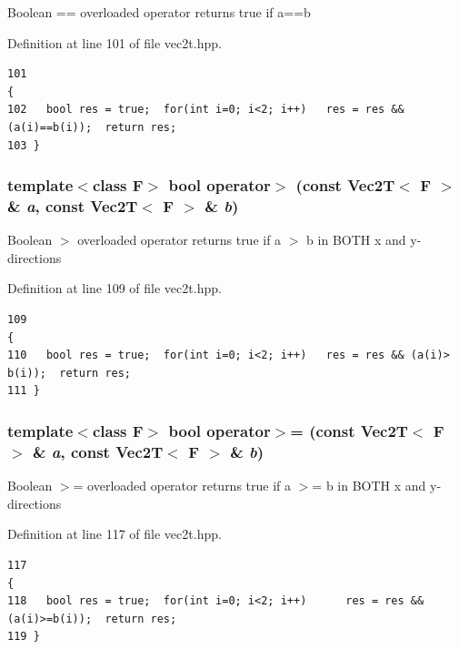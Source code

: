 Boolean == overloaded operator returns true if a==b 

Definition at line 101 of file vec2t.hpp.

\footnotesize\begin{verbatim}101                                                                                 {
102   bool res = true;  for(int i=0; i<2; i++)   res = res && (a(i)==b(i));  return res;
103 }
\end{verbatim}\normalsize 


\subsubsection{\setlength{\rightskip}{0pt plus 5cm}template$<$class F$>$ bool operator$>$ (const {\bf Vec2T}$<$ F $>$ \& {\em a}, const {\bf Vec2T}$<$ F $>$ \& {\em b})\hspace{0.3cm}{\tt  [inline]}}\label{vec2t_8hpp_ac92411ced16369dda52cb213e8e00d2_ac92411ced16369dda52cb213e8e00d2}


Boolean $>$ overloaded operator returns true if a $>$ b in BOTH x and y-directions 

Definition at line 109 of file vec2t.hpp.

\footnotesize\begin{verbatim}109                                                                                 {
110   bool res = true;  for(int i=0; i<2; i++)   res = res && (a(i)> b(i));  return res; 
111 }
\end{verbatim}\normalsize 


\subsubsection{\setlength{\rightskip}{0pt plus 5cm}template$<$class F$>$ bool operator$>$= (const {\bf Vec2T}$<$ F $>$ \& {\em a}, const {\bf Vec2T}$<$ F $>$ \& {\em b})\hspace{0.3cm}{\tt  [inline]}}\label{vec2t_8hpp_079e1b86dbc5174cb1e0d1602ba9c56b_079e1b86dbc5174cb1e0d1602ba9c56b}


Boolean $>$= overloaded operator returns true if a $>$= b in BOTH x and y-directions 

Definition at line 117 of file vec2t.hpp.

\footnotesize\begin{verbatim}117                                                                                 {
118   bool res = true;  for(int i=0; i<2; i++)      res = res && (a(i)>=b(i));  return res; 
119 }
\end{verbatim}\normalsize 


